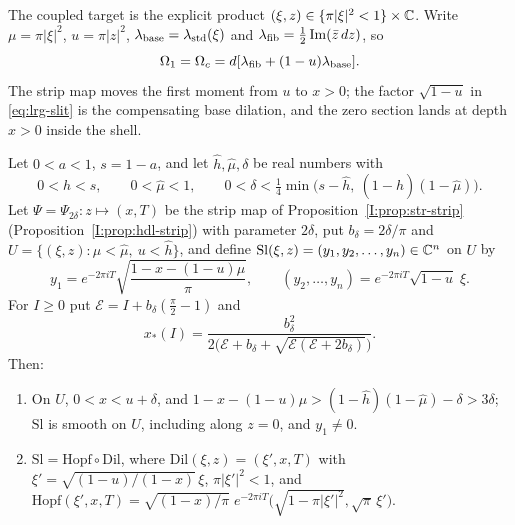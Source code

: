 The coupled target is the explicit product $(\xi,z)\in\{\pi|\xi|^2<1\}\times\mathbb{C}$. Write $\mu=\pi|\xi|^2$, $u=\pi|z|^2$, $\lambda_{\rm base}=\lambda_{\rm std}(\xi)$ and
$\lambda_{\rm fib}=\frac12\operatorname{Im}(\bar z\,dz)$, so
\begin{equation}\label{eq:two-coupled}
 \Omega_1=\Omega_c=d[\lambda_{\rm fib}+(1-u)\lambda_{\rm base}].
\end{equation}
The strip map moves the first moment from $u$ to $x>0$; the factor $\sqrt{1-u}$ in \eqref{eq:lrg-slit} is the
compensating base dilation, and the zero section lands at depth $x>0$ inside the shell.

\begin{lemma}\label{lem:two-slit}\label{lem:lrg-slit}
Let $0<a<1$, $s=1-a$, and let $\hat h,\hat\mu,\delta$ be real numbers with
\[
 0<\hat h<s,\qquad 0<\hat\mu<1,\qquad 0<\delta<\tfrac14\min\bigl(s-\hat h,\ (1-\hat h)(1-\hat\mu)\bigr).
\]
Let $\Psi=\Psi_{2\delta}\colon z\mapsto(x,T)$ be the strip map of Proposition~\ref{I:prop:str-strip}
(Proposition~\ref{I:prop:hdl-strip}) with parameter $2\delta$, put $b_\delta=2\delta/\pi$ and $U=\{(\xi,z):\mu<\hat\mu,\ u<\hat h\}$,
and define $\mathrm{Sl}(\xi,z)=(y_1,y_2,\dots,y_n)\in\mathbb{C}^n$ on $U$ by
\begin{equation}\label{eq:lrg-slit}
 y_1=e^{-2\pi iT}\sqrt{\frac{1-x-(1-u)\mu}{\pi}},\qquad
 (y_2,\dots,y_n)=e^{-2\pi iT}\sqrt{1-u}\;\xi .
\end{equation}
For $I\ge0$ put $\mathcal E=I+b_\delta(\frac\pi2-1)$ and
\begin{equation}\label{eq:lrg-xstar}
 x_*(I)=\frac{b_\delta^2}{2\bigl(\mathcal E+b_\delta+\sqrt{\mathcal E(\mathcal E+2b_\delta)}\bigr)}.
\end{equation}
Then:
\begin{enumerate}[label=(\roman*)]
\item On $U$, $0<x<u+\delta$, and $1-x-(1-u)\mu>(1-\hat h)(1-\hat\mu)-\delta>3\delta$; $\mathrm{Sl}$ is smooth on $U$,
including along $z=0$, and $y_1\ne0$.
\item $\mathrm{Sl}=\mathrm{Hopf}\circ\mathrm{Dil}$, where $\mathrm{Dil}(\xi,z)=(\xi',x,T)$ with $\xi'=\sqrt{(1-u)/(1-x)}\,\xi$, $\pi|\xi'|^2<1$, and
$\mathrm{Hopf}(\xi',x,T)=\sqrt{(1-x)/\pi}\;e^{-2\pi iT}\bigl(\sqrt{1-\pi|\xi'|^2},\sqrt\pi\,\xi'\bigr)$.

\end{enumerate}
\end{lemma}
